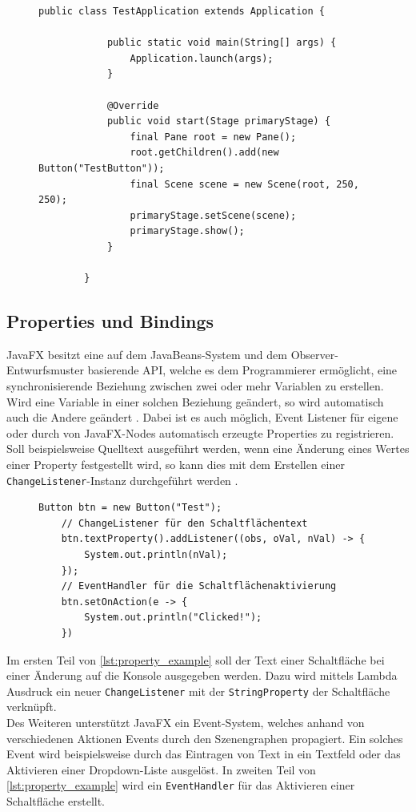 \begin{figure}[H]
	\begin{lstlisting}[caption={Beispiel -- Minimale JavaFX-Anwendung.}, captionpos=b, label=lst:example_javafxapp]
		public class TestApplication extends Application {
			
			public static void main(String[] args) {
				Application.launch(args);
			}
			
			@Override
			public void start(Stage primaryStage) {
				final Pane root = new Pane();
				root.getChildren().add(new Button("TestButton"));
				final Scene scene = new Scene(root, 250, 250);
				primaryStage.setScene(scene);
				primaryStage.show();
			}
		
		}
	\end{lstlisting}
\end{figure}
\subsection{Properties und Bindings}
JavaFX besitzt eine auf dem JavaBeans-System und dem Observer-Entwurfsmuster basierende API, welche es dem Programmierer ermöglicht, eine synchronisierende Beziehung zwischen zwei oder mehr Variablen zu erstellen. Wird eine Variable in einer solchen Beziehung geändert, so wird automatisch auch die Andere geändert \cite{Hommel2013}. Dabei ist es auch möglich, Event Listener für eigene oder durch von JavaFX-Nodes automatisch erzeugte Properties zu registrieren. Soll beispielsweise Quelltext ausgeführt werden, wenn eine Änderung eines Wertes einer Property festgestellt wird, so kann dies mit dem Erstellen einer \texttt{ChangeListener}-Instanz durchgeführt werden \cite{Gao2019}. 
\begin{figure}[H]
	\begin{lstlisting}[caption=Beispiel -- ChangeListener \& EventHandler., captionpos=b, label=lst:property_example]
	Button btn = new Button("Test");
	// ChangeListener für den Schaltflächentext
	btn.textProperty().addListener((obs, oVal, nVal) -> {
		System.out.println(nVal);
	});	
	// EventHandler für die Schaltflächenaktivierung
	btn.setOnAction(e -> {
		System.out.println("Clicked!");
	})
	\end{lstlisting}
\end{figure}
\noindent Im ersten Teil von \autoref{lst:property_example} soll der Text einer Schaltfläche bei einer Änderung auf die Konsole ausgegeben werden. Dazu wird mittels Lambda Ausdruck ein neuer \texttt{ChangeListener} mit der \texttt{StringProperty} der Schaltfläche verknüpft.\\
Des Weiteren unterstützt JavaFX ein Event-System, welches anhand von verschiedenen Aktionen Events durch den Szenengraphen propagiert. Ein solches Event wird beispielsweise durch das Eintragen von Text in ein Textfeld oder das Aktivieren einer Dropdown-Liste ausgelöst. In zweiten Teil von \autoref{lst:property_example} wird ein \texttt{EventHandler} für das Aktivieren einer Schaltfläche erstellt.

